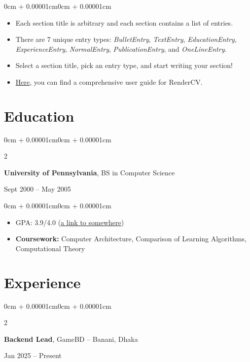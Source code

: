 \documentclass[10pt, letterpaper]{article}
\newenvironment{highlights}{
  \begin{itemize}[
    topsep=0.10cm,
    parsep=0.10cm,
    partopsep=0pt,
    itemsep=0pt,
    leftmargin=0cm + 10pt
  ]
}{
  \end{itemize}
}
\newenvironment{highlightsforbulletentries}{
  \begin{itemize}[
    topsep=0.10cm,
    parsep=0.10cm,
    partopsep=0pt,
    itemsep=0pt,
    leftmargin=10pt
  ]
}{
  \end{itemize}
}
\newenvironment{onecolentry}{
  \begin{adjustwidth}{0cm + 0.00001cm}{0cm + 0.00001cm}
}{
  \end{adjustwidth}
}
\newenvironment{twocolentry}[2][]{
  \onecolentry
  \def\secondColumn{#2}
  \setcolumnwidth{\fill, 4.5cm}
  \begin{paracol}{2}
}{
  \switchcolumn \raggedleft \secondColumn
  \end{paracol}
  \endonecolentry
}
\begin{document}
\begin{onecolentry}
    \begin{highlightsforbulletentries}
        \item Each section title is arbitrary and each section contains a list of entries.
        \item There are 7 unique entry types: \textit{BulletEntry}, \textit{TextEntry}, \textit{EducationEntry}, \textit{ExperienceEntry}, \textit{NormalEntry}, \textit{PublicationEntry}, and \textit{OneLineEntry}.
        \item Select a section title, pick an entry type, and start writing your section!
        \item \href{https://docs.rendercv.com/user_guide/}{Here}, you can find a comprehensive user guide for RenderCV.
    \end{highlightsforbulletentries}
\end{onecolentry}

\section{Education}

\begin{twocolentry}{Sept 2000 – May 2005}
    \textbf{University of Pennsylvania}, BS in Computer Science
\end{twocolentry}

\vspace{0.10cm}

\begin{onecolentry}
    \begin{highlights}
        \item GPA: 3.9/4.0 (\href{https://example.com}{a link to somewhere})
        \item \textbf{Coursework:} Computer Architecture, Comparison of Learning Algorithms, Computational Theory
    \end{highlights}
\end{onecolentry}

\section{Experience}

\begin{twocolentry}{Jan 2025 -- Present}
    \textbf{Backend Lead}, GameBD -- Banani, Dhaka
\end{twocolentry}
\end{document}

